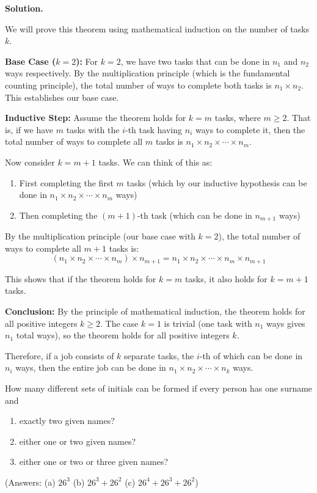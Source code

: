 \noindent\textbf{Solution.}

We will prove this theorem using mathematical induction on the number of tasks $k$.

\textbf{Base Case ($k = 2$):} 
For $k = 2$, we have two tasks that can be done in $n_1$ and $n_2$ ways respectively. By the multiplication principle (which is the fundamental counting principle), the total number of ways to complete both tasks is $n_1 \times n_2$. This establishes our base case.

\textbf{Inductive Step:}
Assume the theorem holds for $k = m$ tasks, where $m \geq 2$. That is, if we have $m$ tasks with the $i$-th task having $n_i$ ways to complete it, then the total number of ways to complete all $m$ tasks is $n_1 \times n_2 \times \cdots \times n_m$.

Now consider $k = m + 1$ tasks. We can think of this as:
\begin{enumerate}
\item First completing the first $m$ tasks (which by our inductive hypothesis can be done in $n_1 \times n_2 \times \cdots \times n_m$ ways)
\item Then completing the $(m+1)$-th task (which can be done in $n_{m+1}$ ways)
\end{enumerate}

By the multiplication principle (our base case with $k=2$), the total number of ways to complete all $m+1$ tasks is:
\[(n_1 \times n_2 \times \cdots \times n_m) \times n_{m+1} = n_1 \times n_2 \times \cdots \times n_m \times n_{m+1}\]

This shows that if the theorem holds for $k = m$ tasks, it also holds for $k = m + 1$ tasks.

\textbf{Conclusion:}
By the principle of mathematical induction, the theorem holds for all positive integers $k \geq 2$. The case $k = 1$ is trivial (one task with $n_1$ ways gives $n_1$ total ways), so the theorem holds for all positive integers $k$.

Therefore, if a job consists of $k$ separate tasks, the $i$-th of which can be done in $n_i$ ways, then the entire job can be done in $n_1 \times n_2 \times \cdots \times n_k$ ways.


\begin{problembox}
How many different sets of initials can be formed if every person has one surname and
\begin{enumerate}[label=(\alph*)]
    \item exactly two given names?
    \item either one or two given names?
    \item either one or two or three given names?
\end{enumerate}
(Answers: (a) $26^3$ (b) $26^3 + 26^2$ (c) $26^4 + 26^3 + 26^2$)
\end{problembox}


